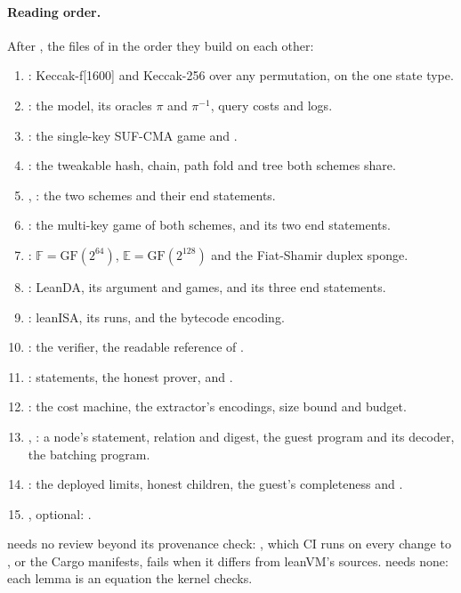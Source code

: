 \documentclass[11pt]{article}
\begin{document}
\paragraph{Reading order.} After , the files of  in the order they build on each other:
\begin{enumerate}\itemsep0pt
\item {}: Keccak-f[1600] and Keccak-256 over any permutation, on the one state type.
\item {}: the model, its oracles $\pi$ and $\pi^{-1}$, query costs and logs.
\item {}: the single-key SUF-CMA game and .
\item {}: the tweakable hash, chain, path fold and tree both schemes share.
\item {}, : the two schemes and their end statements.
\item {}: the multi-key game of both schemes,  and its two end statements.
\item {}: $\mathbb{F} = \mathrm{GF}(2^{64})$, $\mathbb{E} = \mathrm{GF}(2^{128})$ and the Fiat-Shamir duplex sponge.
\item {}: LeanDA, its argument and games, and its three end statements.
\item {}: leanISA, its runs,  and the bytecode encoding.
\item {}: the verifier, the readable reference of .
\item {}: statements, the honest prover,  and .
\item {}: the cost machine, the extractor's encodings, size bound and budget.
\item {}, : a node's statement, relation and digest, the guest program and its decoder, the batching program.
\item {}: the deployed limits, honest children, the guest's completeness and .
\item {}, optional: .
\end{enumerate}
 needs no review beyond its provenance check: , which CI runs on every change to ,  or the Cargo manifests, fails when it differs from leanVM's sources.  needs none: each  lemma is an equation the kernel checks.
\end{document}
